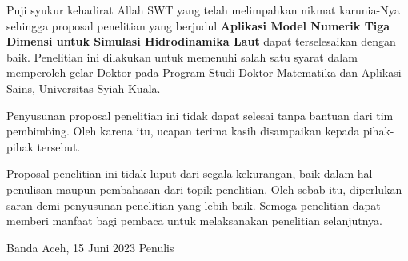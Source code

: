 \begin{spacing}{1.5}
	\pagestyle{empty}
	
	\vskip 1cm
	\par Puji syukur kehadirat Allah SWT yang telah melimpahkan nikmat karunia-Nya sehingga proposal penelitian yang berjudul \textbf{Aplikasi Model Numerik Tiga Dimensi untuk Simulasi Hidrodinamika Laut} dapat terselesaikan dengan baik. Penelitian ini dilakukan untuk memenuhi salah satu syarat dalam memperoleh gelar Doktor pada Program Studi Doktor Matematika dan Aplikasi Sains, Universitas Syiah Kuala.
	\par Penyusunan proposal penelitian ini tidak dapat selesai tanpa bantuan dari tim pembimbing. Oleh karena itu, ucapan terima  kasih disampaikan kepada pihak-pihak tersebut.
	\par Proposal penelitian ini tidak luput dari segala kekurangan, baik dalam hal penulisan maupun pembahasan dari topik penelitian. Oleh sebab itu, diperlukan saran demi penyusunan penelitian yang lebih baik. Semoga penelitian dapat memberi manfaat bagi pembaca untuk melaksanakan penelitian selanjutnya.
	\vskip 1cm  
	\begin{flushright}
		Banda Aceh, 15 Juni 2023
		\vskip 2cm
		Penulis	
	\end{flushright}
\end{spacing}
\pagestyle{empty}